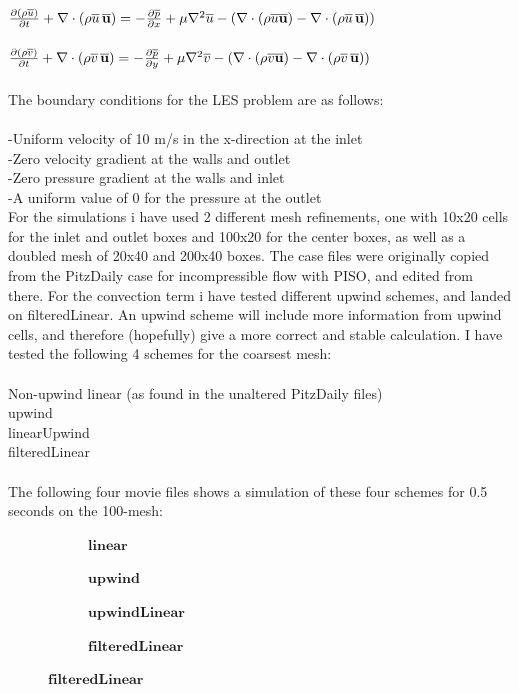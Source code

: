 \documentclass[a4paper,english,12pt,twoside]{article}
\begin{document}
\\
$\frac{\partial (\rho \overline{u})}{\partial t} + \nabla\cdot(\rho \overline{u}\, \mathbf{\overline{u}}) = -\frac{\partial \overline{p}}{\partial x} + \mu\nabla^2\overline{u} - (\nabla\cdot(\rho \overline{u\mathbf{u}}) - \nabla\cdot(\rho \overline{u}\, \mathbf{\overline{u}}))$\\
\\
$\frac{\partial (\rho \overline{v})}{\partial t} + \nabla\cdot(\rho \overline{v}\, \mathbf{\overline{u}}) = -\frac{\partial \overline{p}}{\partial y} + \mu\nabla^2\overline{v} - (\nabla\cdot(\rho \overline{v\mathbf{u}}) - \nabla\cdot(\rho \overline{v}\, \mathbf{\overline{u}}))$\\
\\
The boundary conditions for the LES problem are as follows:\\
\\
-Uniform velocity of 10 m/s in the x-direction at the inlet\\
-Zero velocity gradient at the walls and outlet\\
-Zero pressure gradient at the walls and inlet\\
-A uniform value of 0 for the pressure at the outlet\\

\newpage
For the simulations i have used 2 different mesh refinements, one with 10x20 cells for the inlet and outlet boxes and 100x20 for the center boxes, as well as a doubled mesh of 20x40 and 200x40 boxes. The case files were originally copied from the PitzDaily case for incompressible flow with PISO, and edited from there. For the convection term i have tested different upwind schemes, and landed on filteredLinear. An upwind scheme will include more information from upwind cells, and therefore (hopefully) give a more correct and stable calculation. I have tested the following 4 schemes for the coarsest mesh:\\
\\
Non-upwind linear (as found in the unaltered PitzDaily files)\\
upwind\\
linearUpwind\\
filteredLinear\\
\\
The following four movie files shows a simulation of these four schemes for 0.5 seconds on the 100-mesh:\\
\begin{figure}[h!]
	\begin{subfigure}{0.2\textwidth}
		\caption{$\mathbf{linear}$}
 	\end{subfigure}
	\begin{subfigure}{0.2\textwidth}
		\caption{$\mathbf{upwind}$}
 	\end{subfigure}
	\begin{subfigure}{0.2\textwidth}
		\caption{$\mathbf{upwindLinear}$}
 	\end{subfigure}
	\begin{subfigure}{0.2\textwidth}
		\caption{$\mathbf{filteredLinear}$}
 	\end{subfigure}
\end{figure}
\end{document}
